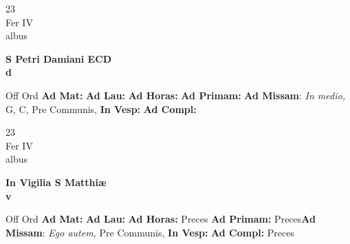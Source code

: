 \documentclass[10pt, openany]{book}
\begin{document}
    \begin{center}
        \begin{minipage}{3.5in}
            \vspace{2em}
            \begin{minipage}{0.5in}
                {\Huge 23} \\
                {\normalsize Fer IV} \\
                {\normalsize albus}
            \end{minipage}
            \begin{minipage}{3.0in}
                \textbf{ \large S Petri Damiani ECD \\
                \textnormal{\normalsize d}} \\ 
            \end{minipage}
            \begin{justify}Off Ord
                \textbf{Ad Mat: }
                \textbf{Ad Lau: }
                \textbf{Ad Horas: }
                \textbf{Ad Primam: }\textbf{Ad Missam}: \textit{In medio,} G, C, Pre Communis,  
                \textbf{In Vesp: }
                \textbf{Ad Compl: }
            \end{justify}
        \end{minipage}
    \end{center}

    \begin{center}
        \begin{minipage}{3.5in}
            \vspace{2em}
            \begin{minipage}{0.5in}
                {\Huge 23} \\
                {\normalsize Fer IV} \\
                {\normalsize albus}
            \end{minipage}
            \begin{minipage}{3.0in}
                \textbf{ \large In Vigilia S Matthiæ \\
                \textnormal{\normalsize v}} \\ 
            \end{minipage}
            \begin{justify}Off Ord
                \textbf{Ad Mat: }
                \textbf{Ad Lau: }
                \textbf{Ad Horas: }Preces
                \textbf{Ad Primam: }Preces\textbf{Ad Missam}: \textit{Ego autem,} Pre Communis,  
                \textbf{In Vesp: }
                \textbf{Ad Compl: }Preces
            \end{justify}
        \end{minipage}
    \end{center}
\end{document}
